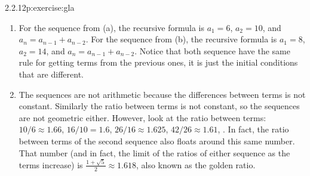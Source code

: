 \documentclass[twoside,11pt,]{book}
\numberwithin{equation}{chapter}
\begin{document}
\begin{divisionsolution}{2.2.12}{}{p:exercise:gla}
\begin{enumerate}[label=(\alph*)]
\begin{equation*}
6, 10, 16, 26, 42, \ldots
\end{equation*}
%
\item{}For the sequence from (a), the recursive formula is              \(a_1 = 6\),              \(a_2 = 10\), and \(a_n = a_{n-1} + a_{n-2}\). For the sequence from (b), the recursive formula is \(a_1 = 8\),              \(a_2 = 14\), and \(a_n = a_{n-1} + a_{n-2}\). Notice that both sequence have the same rule for getting terms from the previous ones, it is just the initial conditions that are different.%
\item{}The sequences are not arithmetic because the differences between terms is not constant. Similarly the ratio between terms is not constant, so the sequences are not geometric either. However, look at the ratio between terms:              \(10/6 \approx 1.66\),              \(16/10 = 1.6\),              \(26/16 \approx 1.625\),              \(42/26 \approx 1.61\),              \textellipsis{}. In fact, the ratio between terms of the second sequence also floats around this same number. That number (and in fact, the limit of the ratios of either sequence as the terms increase) is \(\frac{1 + \sqrt{5}}{2} \approx 1.618\), also known as the golden ratio.%
\end{enumerate}
%
\end{divisionsolution}%
\end{document}
